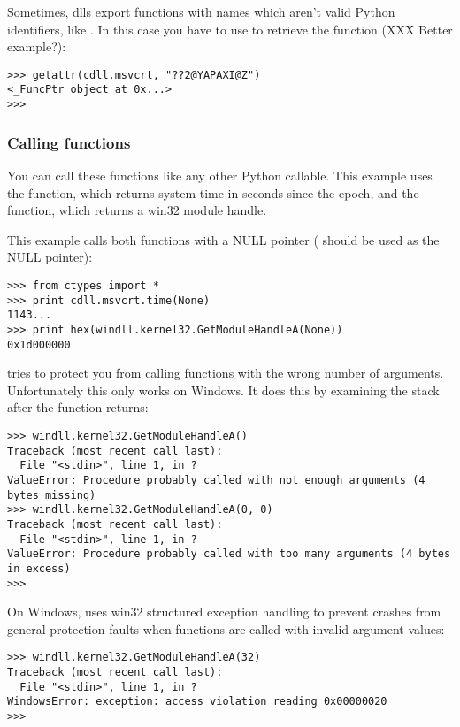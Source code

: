 Sometimes, dlls export functions with names which aren't valid Python
identifiers, like . In this case you have to use
 to retrieve the function (XXX Better example?):
\begin{verbatim}
>>> getattr(cdll.msvcrt, "??2@YAPAXI@Z")
<_FuncPtr object at 0x...>
>>>
\end{verbatim}


\subsubsection{Calling functions\label{ctypes-calling-functions}}

You can call these functions like any other Python callable. This
example uses the  function, which returns system time in
seconds since the \UNIX{} epoch, and the  function,
which returns a win32 module handle.

This example calls both functions with a NULL pointer ( should
be used as the NULL pointer):
\begin{verbatim}
>>> from ctypes import *
>>> print cdll.msvcrt.time(None)
1143...
>>> print hex(windll.kernel32.GetModuleHandleA(None))
0x1d000000
\end{verbatim}

 tries to protect you from calling functions with the wrong
number of arguments.  Unfortunately this only works on Windows.  It
does this by examining the stack after the function returns:
\begin{verbatim}
>>> windll.kernel32.GetModuleHandleA()
Traceback (most recent call last):
  File "<stdin>", line 1, in ?
ValueError: Procedure probably called with not enough arguments (4 bytes missing)
>>> windll.kernel32.GetModuleHandleA(0, 0)
Traceback (most recent call last):
  File "<stdin>", line 1, in ?
ValueError: Procedure probably called with too many arguments (4 bytes in excess)
>>>
\end{verbatim}

On Windows,  uses win32 structured exception handling to
prevent crashes from general protection faults when functions are
called with invalid argument values:
\begin{verbatim}
>>> windll.kernel32.GetModuleHandleA(32)
Traceback (most recent call last):
  File "<stdin>", line 1, in ?
WindowsError: exception: access violation reading 0x00000020
>>>
\end{verbatim}

